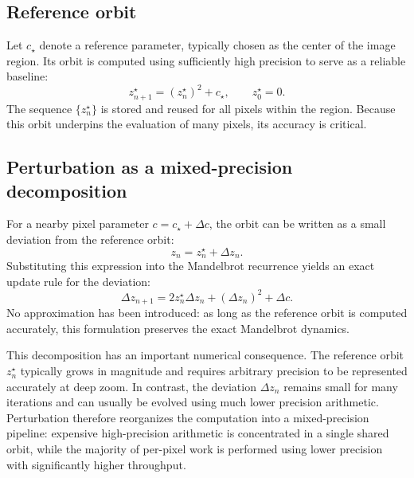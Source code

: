 \subsection{Reference orbit}

Let \(c_\star\) denote a reference parameter, typically chosen as the center of
the image region. Its orbit is computed using sufficiently high precision to
serve as a reliable baseline:
\begin{equation}
z_{n+1}^\star = (z_n^\star)^2 + c_\star, \qquad z_0^\star = 0.
\label{eq:ref-orbit-recurrence}
\end{equation}
The sequence \(\{z_n^\star\}\) is stored and reused for all pixels within the
region. Because this orbit underpins the evaluation of many pixels, its
accuracy is critical.

\subsection{Perturbation as a mixed-precision decomposition}
\label{subsec:perturbation-mixed-precision}

For a nearby pixel parameter \(c = c_\star + \Delta c\), the orbit can be written
as a small deviation from the reference orbit:
\begin{equation}
z_n = z_n^\star + \Delta z_n.
\label{eq:perturb-decomposition}
\end{equation}
Substituting this expression into the Mandelbrot recurrence yields an exact
update rule for the deviation:
\begin{equation}
\Delta z_{n+1}
= 2 z_n^\star \Delta z_n + (\Delta z_n)^2 + \Delta c.
\label{eq:perturb-exact}
\end{equation}
No approximation has been introduced: as long as the reference orbit is computed
accurately, this formulation preserves the exact Mandelbrot dynamics.

This decomposition has an important numerical consequence. The reference orbit
\(z_n^\star\) typically grows in magnitude and requires arbitrary precision to be
represented accurately at deep zoom. In contrast, the deviation \(\Delta z_n\)
remains small for many iterations and can usually be evolved using much lower
precision arithmetic. Perturbation therefore reorganizes the computation into a
mixed-precision pipeline: expensive high-precision arithmetic is concentrated in
a single shared orbit, while the majority of per-pixel work is performed using
lower precision with significantly higher throughput.

